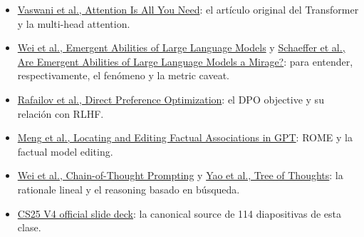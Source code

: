 \documentclass[a4paper]{article}
\begin{document}
\begin{itemize}
  \item \href{https://arxiv.org/abs/1706.03762}{Vaswani et al., Attention Is All You Need}: el artículo original del Transformer y la multi-head attention.
  \item \href{https://arxiv.org/abs/2206.07682}{Wei et al., Emergent Abilities of Large Language Models} y \href{https://arxiv.org/abs/2304.15004}{Schaeffer et al., Are Emergent Abilities of Large Language Models a Mirage?}: para entender, respectivamente, el fenómeno y la metric caveat.
  \item \href{https://arxiv.org/abs/2305.18290}{Rafailov et al., Direct Preference Optimization}: el DPO objective y su relación con RLHF.
  \item \href{https://arxiv.org/abs/2202.05262}{Meng et al., Locating and Editing Factual Associations in GPT}: ROME y la factual model editing.
  \item \href{https://arxiv.org/abs/2201.11903}{Wei et al., Chain-of-Thought Prompting} y \href{https://arxiv.org/abs/2305.10601}{Yao et al., Tree of Thoughts}: la rationale lineal y el reasoning basado en búsqueda.
  \item \href{https://docs.google.com/presentation/d/1oXPs3LXtIVIsVbwTyGjAWj_aWvak9c1uNC4uhkS6glk/edit}{CS25 V4 official slide deck}: la canonical source de 114 diapositivas de esta clase.
\end{itemize}
\end{document}

